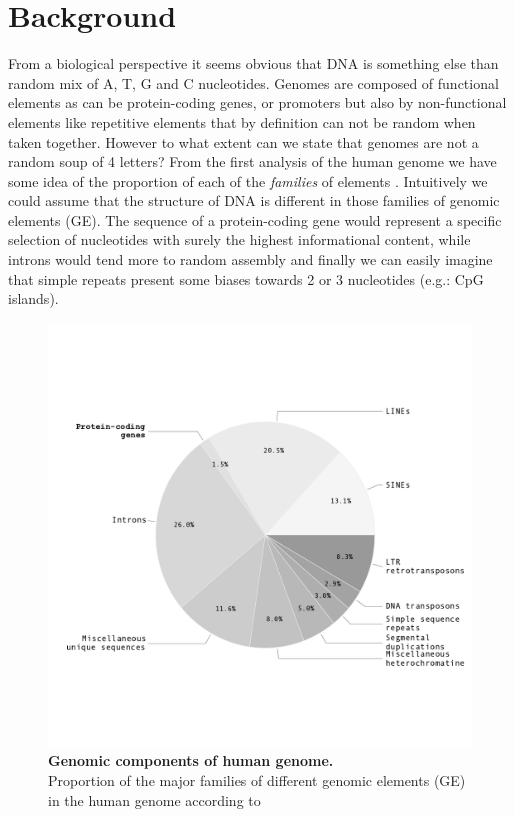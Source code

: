

\section{Background}
\label{sec:dna_struct-intro}

From a biological perspective it seems obvious that DNA is something else than random mix of A, T, G and C nucleotides. Genomes are composed of functional elements as can be protein-coding genes, or promoters but also by non-functional elements like repetitive elements that by definition can not be random when taken together. However to what extent can we state that genomes are not a random soup of 4 letters? From the first analysis of the human genome \cite{Lander2001} we have some idea of the proportion of each of the \textit{families} of elements . Intuitively we could assume that the structure of DNA is different in those families of genomic elements (GE). The sequence of a protein-coding gene would represent a specific selection of nucleotides with surely the highest informational content, while introns would tend more to random assembly and finally we can easily imagine that simple repeats present some biases towards 2 or 3 nucleotides (e.g.: CpG islands).

\begin{figure}[htpb] 
\centering 
\includegraphics[trim=0cm 3cm 0cm 3cm, width=\textwidth]{tex_source/figures/dna_struct/prop_rep.pdf}
\caption[Genomic components of human genome]{{\bf Genomic components of human genome.}\\
Proportion of the major families of different genomic elements (GE) in the human genome according to \cite{Lander2001}}
\label{fig:prop_rep}
\end{figure}



